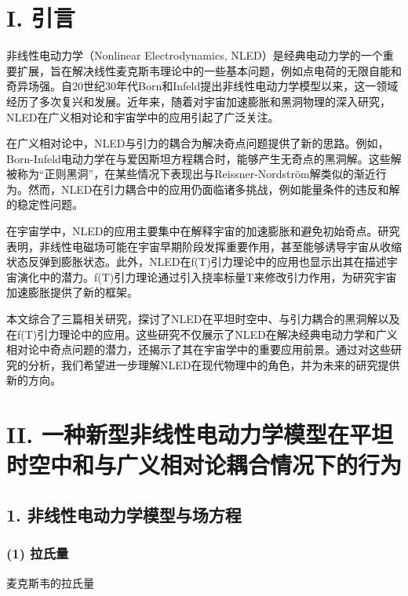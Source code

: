 \documentclass[aps,prl,preprint,groupedaddress,showkeys]{revtex4-2}
\begin{document}

\section{I. 引言}

非线性电动力学（Nonlinear Electrodynamics, NLED）是经典电动力学的一个重要扩展，旨在解决线性麦克斯韦理论中的一些基本问题，例如点电荷的无限自能和奇异场强。自20世纪30年代Born和Infeld提出非线性电动力学模型以来，这一领域经历了多次复兴和发展。近年来，随着对宇宙加速膨胀和黑洞物理的深入研究，NLED在广义相对论和宇宙学中的应用引起了广泛关注。

在广义相对论中，NLED与引力的耦合为解决奇点问题提供了新的思路。例如，Born-Infeld电动力学在与爱因斯坦方程耦合时，能够产生无奇点的黑洞解。这些解被称为“正则黑洞”，在某些情况下表现出与Reissner-Nordström解类似的渐近行为。然而，NLED在引力耦合中的应用仍面临诸多挑战，例如能量条件的违反和解的稳定性问题。

在宇宙学中，NLED的应用主要集中在解释宇宙的加速膨胀和避免初始奇点。研究表明，非线性电磁场可能在宇宙早期阶段发挥重要作用，甚至能够诱导宇宙从收缩状态反弹到膨胀状态。此外，NLED在f(T)引力理论中的应用也显示出其在描述宇宙演化中的潜力。f(T)引力理论通过引入挠率标量T来修改引力作用，为研究宇宙加速膨胀提供了新的框架。

本文综合了三篇相关研究\cite{kar2024aspects, breton2007nonlinear, sharif2013nonlinear}，探讨了NLED在平坦时空中、与引力耦合的黑洞解以及在f(T)引力理论中的应用。这些研究不仅展示了NLED在解决经典电动力学和广义相对论中奇点问题的潜力，还揭示了其在宇宙学中的重要应用前景。通过对这些研究的分析，我们希望进一步理解NLED在现代物理中的角色，并为未来的研究提供新的方向。

\section{II. 一种新型非线性电动力学模型在平坦时空中和与广义相对论耦合情况下的行为}

\subsection{1. 非线性电动力学模型与场方程}

\subsubsection{(1) 拉氏量}

麦克斯韦的拉氏量
\end{document}
